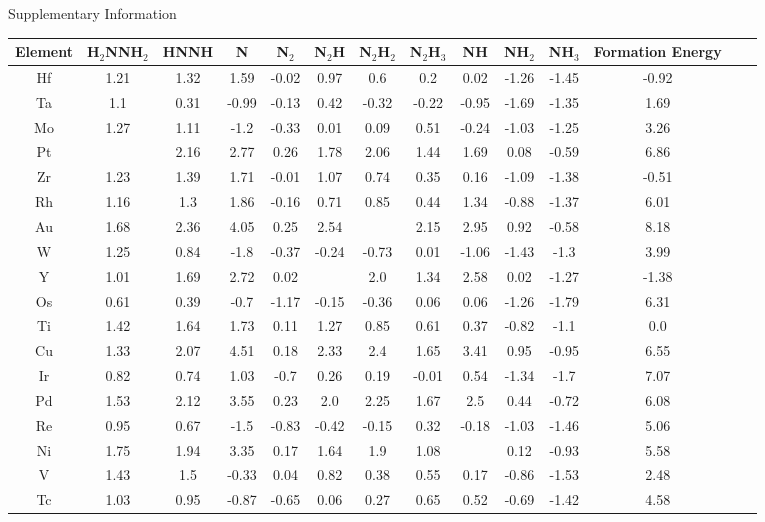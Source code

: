 Supplementary Information
\onecolumn
\begin{table}
\begin{center}
\begin{tabular}{| c | c | c | c | c | c | c | c | c | c | c | c | c | c |}
\hline
Element & H$_2$NNH$_2$ & HNNH & N & N$_2$ & N$_2$H & N$_2$H$_2$ & N$_2$H$_3$ & NH & NH$_2$ & NH$_3$ & Formation Energy\\
\hline

Hf & 1.21 & 1.32 & 1.59 & -0.02 & 0.97 & 0.6 & 0.2 & 0.02 & -1.26 & -1.45 & -0.92 \\
Ta & 1.1 & 0.31 & -0.99 & -0.13 & 0.42 & -0.32 & -0.22 & -0.95 & -1.69 & -1.35 & 1.69 \\
Mo & 1.27 & 1.11 & -1.2 & -0.33 & 0.01 & 0.09 & 0.51 & -0.24 & -1.03 & -1.25 & 3.26 \\
Pt &  & 2.16 & 2.77 & 0.26 & 1.78 & 2.06 & 1.44 & 1.69 & 0.08 & -0.59 & 6.86 \\
Zr & 1.23 & 1.39 & 1.71 & -0.01 & 1.07 & 0.74 & 0.35 & 0.16 & -1.09 & -1.38 & -0.51 \\
Rh & 1.16 & 1.3 & 1.86 & -0.16 & 0.71 & 0.85 & 0.44 & 1.34 & -0.88 & -1.37 & 6.01 \\
Au & 1.68 & 2.36 & 4.05 & 0.25 & 2.54 &  & 2.15 & 2.95 & 0.92 & -0.58 & 8.18 \\
W & 1.25 & 0.84 & -1.8 & -0.37 & -0.24 & -0.73 & 0.01 & -1.06 & -1.43 & -1.3 & 3.99 \\
Y & 1.01 & 1.69 & 2.72 & 0.02 &  & 2.0 & 1.34 & 2.58 & 0.02 & -1.27 & -1.38 \\
Os & 0.61 & 0.39 & -0.7 & -1.17 & -0.15 & -0.36 & 0.06 & 0.06 & -1.26 & -1.79 & 6.31 \\
Ti & 1.42 & 1.64 & 1.73 & 0.11 & 1.27 & 0.85 & 0.61 & 0.37 & -0.82 & -1.1 & 0.0 \\
Cu & 1.33 & 2.07 & 4.51 & 0.18 & 2.33 & 2.4 & 1.65 & 3.41 & 0.95 & -0.95 & 6.55 \\
Ir & 0.82 & 0.74 & 1.03 & -0.7 & 0.26 & 0.19 & -0.01 & 0.54 & -1.34 & -1.7 & 7.07 \\
Pd & 1.53 & 2.12 & 3.55 & 0.23 & 2.0 & 2.25 & 1.67 & 2.5 & 0.44 & -0.72 & 6.08 \\
Re & 0.95 & 0.67 & -1.5 & -0.83 & -0.42 & -0.15 & 0.32 & -0.18 & -1.03 & -1.46 & 5.06 \\
Ni & 1.75 & 1.94 & 3.35 & 0.17 & 1.64 & 1.9 & 1.08 &  & 0.12 & -0.93 & 5.58 \\
V & 1.43 & 1.5 & -0.33 & 0.04 & 0.82 & 0.38 & 0.55 & 0.17 & -0.86 & -1.53 & 2.48 \\
Tc & 1.03 & 0.95 & -0.87 & -0.65 & 0.06 & 0.27 & 0.65 & 0.52 & -0.69 & -1.42 & 4.58 \\

\end{tabular}
\end{center}
\end{table}
